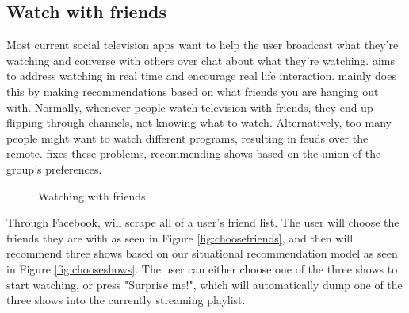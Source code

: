 \subsection{Watch with friends}
Most current social television apps want to help the user broadcast
what they're watching and converse with others over chat about what
they’re watching.  {\sys} aims to address watching in real time and
encourage real life interaction.  {\sys} mainly does this by making
recommendations based on what friends you are hanging out with.
Normally, whenever people watch television with friends, they end up
flipping through channels, not knowing what to watch.  Alternatively,
too many people might want to watch different programs, resulting in
feuds over the remote.  {\sys} fixes these problems, recommending
shows based on the union of the group's preferences.

\begin{figure}
\centering
{}


\caption{Watching with friends}
\label{fig:friends}
\end{figure}

Through Facebook, {\sys} will scrape all of a user's friend list.  The
user will choose the friends they are with as seen in Figure \ref{fig:choosefriends}, and then {\sys} will
recommend three shows based on our situational recommendation model as seen in Figure \ref{fig:chooseshows}.
The user can either choose one of the three shows to start watching,
or press "Surprise me!", which will automatically dump one of the
three shows into the currently streaming playlist.

